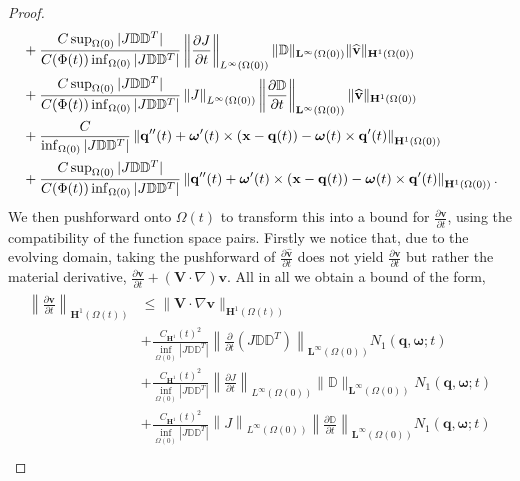 \documentclass[a4paper]{amsart}
\numberwithin{equation}{section}
\newcommand{\ddt}[1]{\frac{\partial #1}{\partial t}}
\newcommand{\grad}{\nabla}
\theoremstyle{plain}
\newcommand{\mbf}[1]{\mathbf{#1}}
\newcommand{\mbb}[1]{\mathbb{#1}}
\begin{document}
\begin{proof}
\begin{align}
    &+ \frac{C \sup_{\Omega(0)}|J \mbb{D} \mbb{D}^T|}{C(\Phi(t)) \inf_{\Omega(0)} |J \mbb{D} \mbb{D}^T| }\left\|  \ddt{J} \right\|_{L^\infty(\Omega(0))} \| \mbb{D}\|_{\mbf{L}^\infty(\Omega(0))} \|\widehat{\mbf{v}}\|_{\mbf{H}^1(\Omega(0))} \label{stokes regularity2}\\
    &+ \frac{C \sup_{\Omega(0)}|J \mbb{D} \mbb{D}^T|}{C(\Phi(t)) \inf_{\Omega(0)} |J \mbb{D} \mbb{D}^T| }\left\|  J \right\|_{L^\infty(\Omega(0))} \left\| \ddt{\mbb{D}}\right\|_{\mbf{L}^\infty(\Omega(0))} \|\widehat{\mbf{v}}\|_{\mbf{H}^1(\Omega(0))} \notag \\
    &+ \frac{C}{\inf_{\Omega(0)} |J \mbb{D} \mbb{D}^T|} \left\| \mbf{q}''(t) + \boldsymbol{\omega}'(t)\times(\mbf{x} - \mbf{q}(t)) - \boldsymbol{\omega}(t) \times \mbf{q}'(t) \right\|_{\mbf{H}^1(\Omega(0))}\notag \\
    &+ \frac{C \sup_{\Omega(0)}|J \mbb{D} \mbb{D}^T|}{C(\Phi(t)) \inf_{\Omega(0)} |J \mbb{D} \mbb{D}^T| } \left\| \mbf{q}''(t) + \boldsymbol{\omega}'(t)\times(\mbf{x} - \mbf{q}(t)) - \boldsymbol{\omega}(t) \times \mbf{q}'(t) \right\|_{\mbf{H}^1(\Omega(0))}.\notag
\end{align}
We then pushforward onto $\Omega(t)$ to transform this into a bound for $\ddt{\mbf{v}}$, using the compatibility of the function space pairs.
Firstly we notice that, due to the evolving domain, taking the pushforward of $\frac{\partial \widehat{\mbf{v}}}{\partial t}$ does not yield $\frac{\partial \mbf{v}}{\partial t}$ but rather the material derivative, $\frac{\partial \mbf{v}}{\partial t} + (\mbf{V} \cdot \grad) \mbf{v}$.
All in all we obtain a bound of the form,
\begin{align}
\begin{aligned}
    \left\|  \ddt{\mbf{v}} \right\|_{\mbf{H}^1(\Omega(t))} &\leq \| \mbf{V}\cdot \grad \mbf{v}\|_{\mbf{H}^1(\Omega(t))}\\
    &+ \frac{C_{\mbf{H}^1}(t)^2}{\inf_{\Omega(0)} |J \mbb{D} \mbb{D}^T|} \left\| \ddt{}(J \mbb{D} \mbb{D}^T) \right\|_{\mbf{L}^\infty(\Omega(0))} N_1(\mbf{q}, \boldsymbol{\omega};t)\\
    &+ \frac{C_{\mbf{H}^1}(t)^2}{\inf_{\Omega(0)} |J \mbb{D} \mbb{D}^T|}\left\| \ddt{J} \right\|_{L^\infty(\Omega(0))} \| \mbb{D} \|_{\mbf{L}^\infty(\Omega(0))} N_1(\mbf{q}, \boldsymbol{\omega};t)\\
    &+ \frac{C_{\mbf{H}^1}(t)^2}{\inf_{\Omega(0)} |J \mbb{D} \mbb{D}^T|}\left\| J\right\|_{L^\infty(\Omega(0))} \left\| \ddt{\mbb{D}} \right\|_{\mbf{L}^\infty(\Omega(0))} N_1(\mbf{q}, \boldsymbol{\omega};t)\\

\end{aligned}
\end{align}
\end{proof}
\end{document}

